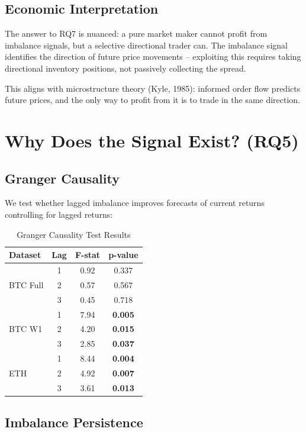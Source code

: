 \documentclass[12pt,a4paper]{article}
\begin{document}
\subsection{Economic Interpretation}

The answer to RQ7 is nuanced: a pure market maker cannot profit from imbalance signals, but a selective directional trader can. The imbalance signal identifies the direction of future price movements -- exploiting this requires taking directional inventory positions, not passively collecting the spread.

This aligns with microstructure theory (Kyle, 1985): informed order flow predicts future prices, and the only way to profit from it is to trade in the same direction.

\section{Why Does the Signal Exist? (RQ5)}

\subsection{Granger Causality}

We test whether lagged imbalance improves forecasts of current returns controlling for lagged returns:

\begin{table}[H]
\centering
\caption{Granger Causality Test Results}
\label{tab:granger}
\begin{tabular}{lccc}
\toprule
\textbf{Dataset} & \textbf{Lag} & \textbf{F-stat} & \textbf{p-value} \\
\midrule
\multirow{3}{*}{BTC Full} & 1 & 0.92 & 0.337 \\
 & 2 & 0.57 & 0.567 \\
 & 3 & 0.45 & 0.718 \\
\midrule
\multirow{3}{*}{BTC W1} & 1 & 7.94 & \textbf{0.005} \\
 & 2 & 4.20 & \textbf{0.015} \\
 & 3 & 2.85 & \textbf{0.037} \\
\midrule
\multirow{3}{*}{ETH} & 1 & 8.44 & \textbf{0.004} \\
 & 2 & 4.92 & \textbf{0.007} \\
 & 3 & 3.61 & \textbf{0.013} \\
\bottomrule
\end{tabular}
\end{table}

\subsection{Imbalance Persistence}
\end{document}
